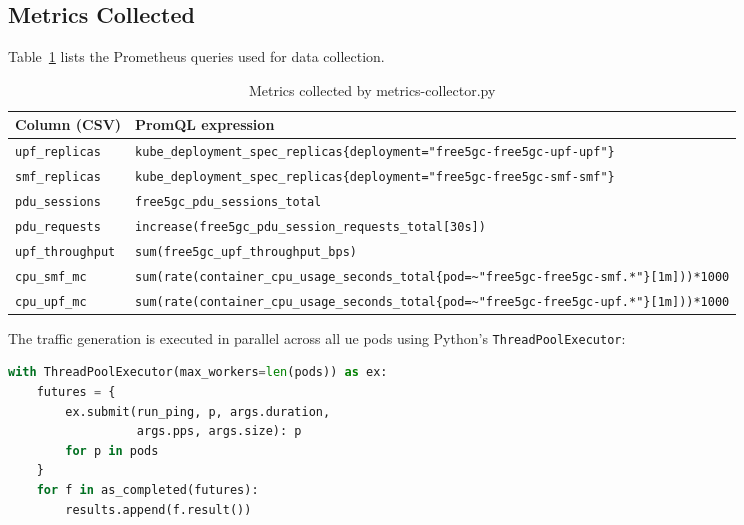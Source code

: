 \subsection{Metrics Collected}

Table~\ref{tab:metrics_collected} lists the Prometheus queries used for data collection.

\begin{table}[H]
  \centering
  \caption{Metrics collected by metrics-collector.py}
  \label{tab:metrics_collected}
  \begin{tabularx}{\linewidth}{lX}
    \toprule
    \textbf{Column (CSV)}  & \textbf{PromQL expression} \\
    \midrule
    \texttt{upf\_replicas}   & \texttt{kube\_deployment\_spec\_replicas\{deployment="free5gc-free5gc-upf-upf"\}} \\
    \texttt{smf\_replicas}   & \texttt{kube\_deployment\_spec\_replicas\{deployment="free5gc-free5gc-smf-smf"\}} \\
    \texttt{pdu\_sessions}   & \texttt{free5gc\_pdu\_sessions\_total} \\
    \texttt{pdu\_requests}   & \texttt{increase(free5gc\_pdu\_session\_requests\_total[30s])} \\
    \texttt{upf\_throughput} & \texttt{sum(free5gc\_upf\_throughput\_bps)} \\
    \texttt{cpu\_smf\_mc}    & \texttt{sum(rate(container\_cpu\_usage\_seconds\_total\{pod=\textasciitilde"free5gc-free5gc-smf.*"\}[1m]))*1000} \\
    \texttt{cpu\_upf\_mc}    & \texttt{sum(rate(container\_cpu\_usage\_seconds\_total\{pod=\textasciitilde"free5gc-free5gc-upf.*"\}[1m]))*1000} \\
    \bottomrule
  \end{tabularx}
\end{table}

The traffic generation is executed in parallel across all \gls{ue} pods using Python's \texttt{ThreadPoolExecutor}:

\begin{lstlisting}[language=python, caption={Parallel traffic generation across UE pods (traffic-gen.py)}, label={lst:traffic_gen}]
with ThreadPoolExecutor(max_workers=len(pods)) as ex:
    futures = {
        ex.submit(run_ping, p, args.duration,
                  args.pps, args.size): p
        for p in pods
    }
    for f in as_completed(futures):
        results.append(f.result())
\end{lstlisting}

